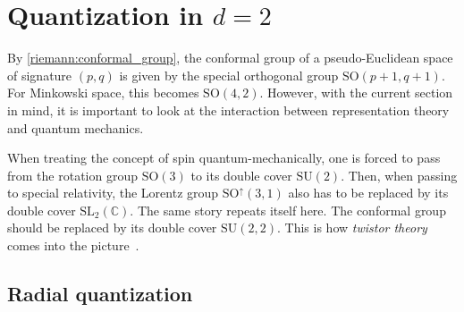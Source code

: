 \section{\texorpdfstring{Quantization in $d=2$}{Quantization in d = 2}}

    By \cref{riemann:conformal_group}, the conformal group of a pseudo-Euclidean space of signature $(p,q)$ is given by the special orthogonal group $\mathrm{SO}(p+1,q+1)$. For Minkowski space, this becomes $\mathrm{SO}(4,2)$. However, with the current section in mind, it is important to look at the interaction between representation theory and quantum mechanics.

    When treating the concept of spin quantum-mechanically, one is forced to pass from the rotation group $\mathrm{SO}(3)$ to its double cover $\mathrm{SU}(2)$. Then, when passing to special relativity, the Lorentz group $\mathrm{SO}^\uparrow(3,1)$ also has to be replaced by its double cover $\mathrm{SL}_2(\mathbb{C})$. The same story repeats itself here. The conformal group should be replaced by its double cover $\mathrm{SU}(2,2)$. This is how \textit{twistor theory} comes into the picture~\citep{penrose_twistor_1967}.

\subsection{Radial quantization}

